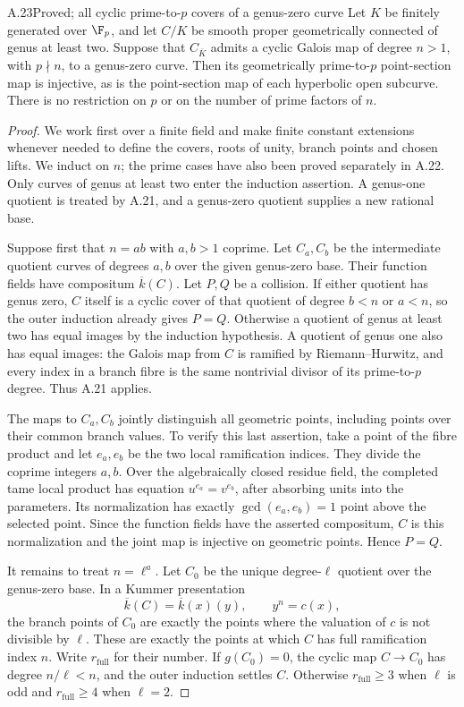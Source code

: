 \begin{claim}{A.23}{Proved; all cyclic prime-to-$p$ covers of a genus-zero curve}
Let $K$ be finitely generated over $\F_p$, and let $C/K$
be smooth proper geometrically connected of genus at least
two. Suppose that $C_{\overline K}$ admits a cyclic Galois
map of degree $n>1$, with $p\nmid n$, to a genus-zero
curve. Then its geometrically prime-to-$p$ point-section
map is injective, as is the point-section map of each
hyperbolic open subcurve. There is no restriction on $p$
or on the number of prime factors of $n$.
\end{claim}
\begin{proof}
We work first over a finite field and make finite constant
extensions whenever needed to define the covers, roots of
unity, branch points and chosen lifts. We induct on $n$;
the prime cases have also been proved separately in A.22.
Only curves of genus at least two enter the induction
assertion. A genus-one quotient is treated by A.21, and a
genus-zero quotient supplies a new rational base.

Suppose first that $n=ab$ with $a,b>1$ coprime. Let
$C_a,C_b$ be the intermediate quotient curves of degrees
$a,b$ over the given genus-zero base. Their function fields
have compositum $\overline k(C)$. Let $P,Q$ be a collision.
If either quotient has genus zero, $C$ itself is a cyclic
cover of that quotient of degree $b<n$ or $a<n$, so the
outer induction already gives $P=Q$. Otherwise a quotient
of genus at least two has equal images by the induction
hypothesis. A quotient of genus one also has equal images:
the Galois map from $C$ is ramified by Riemann--Hurwitz,
and every index in a branch fibre is the same nontrivial
divisor of its prime-to-$p$ degree. Thus A.21 applies.

The maps to $C_a,C_b$ jointly distinguish all geometric
points, including points over their common branch values.
To verify this last assertion, take a point of the fibre
product and let $e_a,e_b$ be the two local ramification
indices. They divide the coprime integers $a,b$. Over the
algebraically closed residue field, the completed tame
local product has equation $u^{e_a}=v^{e_b}$, after
absorbing units into the parameters. Its normalization
has exactly $\gcd(e_a,e_b)=1$ point above the selected
point. Since the function fields have the asserted
compositum, $C$ is this normalization and the joint map is
injective on geometric points. Hence $P=Q$.

It remains to treat $n=\ell^a$. Let $C_0$ be the unique
degree-$\ell$ quotient over the genus-zero base. In a
Kummer presentation
\[
 \overline k(C)=\overline k(x)(y),\qquad y^n=c(x),
\]
the branch points of $C_0$ are exactly the points where
the valuation of $c$ is not divisible by $\ell$. These
are exactly the points at which $C$ has full ramification
index $n$. Write $r_{\mathrm{full}}$ for their number. If
$g(C_0)=0$, the cyclic map $C\to C_0$ has degree
$n/\ell<n$, and the outer induction settles $C$.
Otherwise $r_{\mathrm{full}}\ge3$ when $\ell$ is odd and
$r_{\mathrm{full}}\ge4$ when $\ell=2$.


\end{proof}
